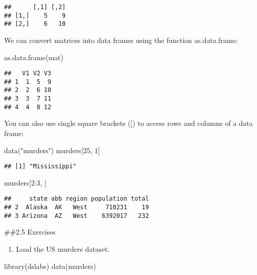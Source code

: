 \documentclass[
]{article}
\newenvironment{Shaded}{\begin{snugshade}}{\end{snugshade}}
\newcommand{\DecValTok}[1]{\textcolor[rgb]{0.00,0.00,0.81}{#1}}
\newcommand{\FunctionTok}[1]{\textcolor[rgb]{0.00,0.00,0.00}{#1}}
\newcommand{\NormalTok}[1]{#1}
\newcommand{\SpecialCharTok}[1]{\textcolor[rgb]{0.00,0.00,0.00}{#1}}
\newcommand{\StringTok}[1]{\textcolor[rgb]{0.31,0.60,0.02}{#1}}
\providecommand{\tightlist}{%
  \setlength{\itemsep}{0pt}\setlength{\parskip}{0pt}}
\begin{document}
\begin{verbatim}
##      [,1] [,2]
## [1,]    5    9
## [2,]    6   10
\end{verbatim}

We can convert matrices into data frames using the function
as.data.frame:

\begin{Shaded}
\begin{Highlighting}[]
\FunctionTok{as.data.frame}\NormalTok{(mat)}
\end{Highlighting}
\end{Shaded}

\begin{verbatim}
##   V1 V2 V3
## 1  1  5  9
## 2  2  6 10
## 3  3  7 11
## 4  4  8 12
\end{verbatim}

You can also use single square brackets ({[}) to access rows and columns
of a data frame:

\begin{Shaded}
\begin{Highlighting}[]
\FunctionTok{data}\NormalTok{(}\StringTok{"murders"}\NormalTok{)}
\NormalTok{murders[}\DecValTok{25}\NormalTok{, }\DecValTok{1}\NormalTok{]}
\end{Highlighting}
\end{Shaded}

\begin{verbatim}
## [1] "Mississippi"
\end{verbatim}

\begin{Shaded}
\begin{Highlighting}[]
\NormalTok{murders[}\DecValTok{2}\SpecialCharTok{:}\DecValTok{3}\NormalTok{, ]}
\end{Highlighting}
\end{Shaded}

\begin{verbatim}
##     state abb region population total
## 2  Alaska  AK   West     710231    19
## 3 Arizona  AZ   West    6392017   232
\end{verbatim}

\#\#2.5 Exercises

\begin{enumerate}
\def\labelenumi{\arabic{enumi}.}
\tightlist
\item
  Load the US murders dataset.
\end{enumerate}

library(dslabs) data(murders)
\end{document}
